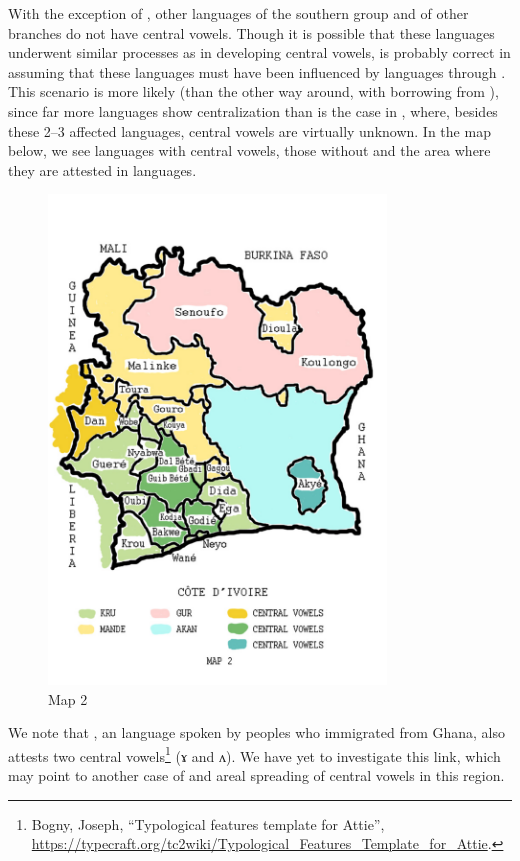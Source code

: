 \documentclass[output=paper,newtxmath,modfonts,nonflat,draft]{langsci/langscibook}
\begin{document}
With the exception of , other languages of the southern  group and of other  branches do not have central vowels.  Though it is possible that these languages underwent similar processes as  in developing central vowels, \citet{Vydrine2009} is probably correct in assuming that these languages must have been influenced by  languages through . This scenario is more likely (than the other way around, with  borrowing from ), since far more  languages show centralization than is the case in , where, besides these 2–3 affected languages, central vowels are virtually unknown.  In the map below, we see  languages with central vowels, those without and the area where they are attested in  languages. 

\begin{figure}
\includegraphics[width=0.8\textwidth]{figures/fig-zogbo-2.png}
\caption{Map 2}
\end{figure}  

We note that , an  language spoken by peoples who immigrated from Ghana, also attests two central vowels\footnote{Bogny, Joseph, “Typological features template for Attie”, \url{https://typecraft.org/tc2wiki/Typological_Features_Template_for_Attie}.} (ɤ and ʌ).  We have yet to investigate this link, which may point to another case of  and areal spreading of central vowels in this region.
\end{document}
